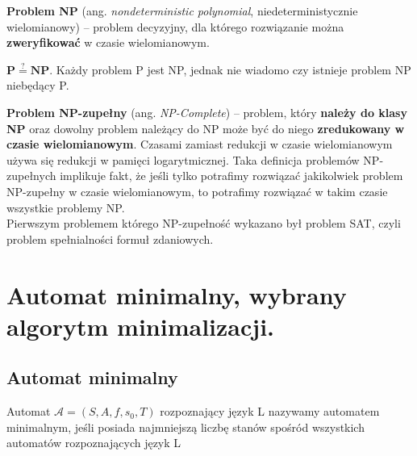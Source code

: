 \documentclass[12pt]{article}
\begin{document}
    \begin{definition}
        \textbf{Problem NP} (ang. \textit{nondeterministic polynomial}, niedeterministycznie wielomianowy) – problem
        decyzyjny, dla którego rozwiązanie można \textbf{zweryfikować} w czasie wielomianowym.
    \end{definition}

    \begin{theorem}
        $\mathbf{P \stackrel{?}{=} NP}$. Każdy problem P jest NP, jednak nie wiadomo czy istnieje problem NP niebędący P.
    \end{theorem}

    \begin{definition}
        \textbf{Problem NP-zupełny} (ang. \textit{NP-Complete}) – problem, który \textbf{należy do klasy NP} oraz dowolny
        problem należący do NP może być do niego \textbf{zredukowany w czasie wielomianowym}. Czasami zamiast redukcji w
        czasie wielomianowym używa się redukcji w pamięci logarytmicznej. Taka definicja problemów NP-zupełnych
        implikuje fakt, że jeśli tylko potrafimy rozwiązać jakikolwiek problem NP-zupełny w czasie wielomianowym,
        to potrafimy rozwiązać w takim czasie wszystkie problemy NP.\\

        Pierwszym problemem którego NP-zupełność wykazano był problem SAT, czyli problem spełnialności formuł zdaniowych.
    \end{definition}

    \newpage

    \section{Automat minimalny, wybrany algorytm minimalizacji.}
    \subsection{Automat minimalny}
    \begin{definition}
        Automat $\mathcal{A} = (S, A, f, s_{0}, T)$ rozpoznający język L nazywamy automatem minimalnym, jeśli posiada najmniejszą liczbę stanów spośród wszystkich automatów rozpoznających język L
    \end{definition}
\end{document}
